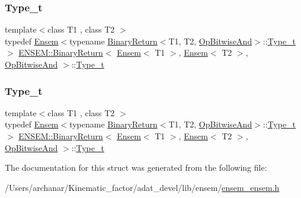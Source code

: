 \subsubsection{\texorpdfstring{Type\_t}{Type\_t}\hspace{0.1cm}{\footnotesize\ttfamily [1/2]}}
{\footnotesize\ttfamily template$<$class T1 , class T2 $>$ \\
typedef \mbox{\hyperlink{classENSEM_1_1Ensem}{Ensem}}$<$typename \mbox{\hyperlink{structENSEM_1_1BinaryReturn}{Binary\+Return}}$<$T1, T2, \mbox{\hyperlink{structENSEM_1_1OpBitwiseAnd}{Op\+Bitwise\+And}}$>$\+::\mbox{\hyperlink{structENSEM_1_1BinaryReturn_3_01Ensem_3_01T1_01_4_00_01Ensem_3_01T2_01_4_00_01OpBitwiseAnd_01_4_ae57c0a7872aa25995d533ea71691c128}{Type\+\_\+t}}$>$ \mbox{\hyperlink{structENSEM_1_1BinaryReturn}{E\+N\+S\+E\+M\+::\+Binary\+Return}}$<$ \mbox{\hyperlink{classENSEM_1_1Ensem}{Ensem}}$<$ T1 $>$, \mbox{\hyperlink{classENSEM_1_1Ensem}{Ensem}}$<$ T2 $>$, \mbox{\hyperlink{structENSEM_1_1OpBitwiseAnd}{Op\+Bitwise\+And}} $>$\+::\mbox{\hyperlink{structENSEM_1_1BinaryReturn_3_01Ensem_3_01T1_01_4_00_01Ensem_3_01T2_01_4_00_01OpBitwiseAnd_01_4_ae57c0a7872aa25995d533ea71691c128}{Type\+\_\+t}}}

\mbox{\label{structENSEM_1_1BinaryReturn_3_01Ensem_3_01T1_01_4_00_01Ensem_3_01T2_01_4_00_01OpBitwiseAnd_01_4_ae57c0a7872aa25995d533ea71691c128}} 
\subsubsection{\texorpdfstring{Type\_t}{Type\_t}\hspace{0.1cm}{\footnotesize\ttfamily [2/2]}}
{\footnotesize\ttfamily template$<$class T1 , class T2 $>$ \\
typedef \mbox{\hyperlink{classENSEM_1_1Ensem}{Ensem}}$<$typename \mbox{\hyperlink{structENSEM_1_1BinaryReturn}{Binary\+Return}}$<$T1, T2, \mbox{\hyperlink{structENSEM_1_1OpBitwiseAnd}{Op\+Bitwise\+And}}$>$\+::\mbox{\hyperlink{structENSEM_1_1BinaryReturn_3_01Ensem_3_01T1_01_4_00_01Ensem_3_01T2_01_4_00_01OpBitwiseAnd_01_4_ae57c0a7872aa25995d533ea71691c128}{Type\+\_\+t}}$>$ \mbox{\hyperlink{structENSEM_1_1BinaryReturn}{E\+N\+S\+E\+M\+::\+Binary\+Return}}$<$ \mbox{\hyperlink{classENSEM_1_1Ensem}{Ensem}}$<$ T1 $>$, \mbox{\hyperlink{classENSEM_1_1Ensem}{Ensem}}$<$ T2 $>$, \mbox{\hyperlink{structENSEM_1_1OpBitwiseAnd}{Op\+Bitwise\+And}} $>$\+::\mbox{\hyperlink{structENSEM_1_1BinaryReturn_3_01Ensem_3_01T1_01_4_00_01Ensem_3_01T2_01_4_00_01OpBitwiseAnd_01_4_ae57c0a7872aa25995d533ea71691c128}{Type\+\_\+t}}}



The documentation for this struct was generated from the following file\+:\begin{DoxyCompactItemize}
\item 
/\+Users/archanar/\+Kinematic\+\_\+factor/adat\+\_\+devel/lib/ensem/\mbox{\hyperlink{lib_2ensem_2ensem__ensem_8h}{ensem\+\_\+ensem.\+h}}\end{DoxyCompactItemize}
